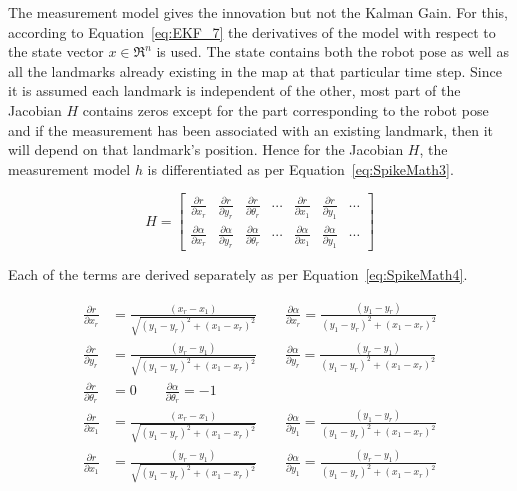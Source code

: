 The measurement model gives the innovation but not the Kalman Gain. For this, according to Equation~\ref{eq:EKF_7} the derivatives of the model with respect to the state vector $ x \in \Re^n $ is used. The state contains both the robot pose as well as all the landmarks already existing in the map at that particular time step. Since it is assumed each landmark is independent of the other, most part of the Jacobian $ H $ contains zeros except for the part corresponding to the robot pose and if the measurement has been associated with an existing landmark, then it will depend on that landmark's position. Hence for the Jacobian $ H $, the measurement model $ h $ is differentiated as per Equation~\ref{eq:SpikeMath3}. 

\begin{equation}
\label{eq:SpikeMath3}
	H = 
	\begin{bmatrix}
	\frac{\partial r}{\partial x_r} & \frac{\partial r}{\partial y_r} & \frac{\partial r}{\partial \theta_r} & \cdots & \frac{\partial r}{\partial x_1} & \frac{\partial r}{\partial y_1} & \cdots \\
	\frac{\partial \alpha}{\partial x_r} & \frac{\partial \alpha}{\partial y_r} & \frac{\partial \alpha}{\partial \theta_r} & \cdots & \frac{\partial \alpha}{\partial x_1} & \frac{\partial \alpha}{\partial y_1} & \cdots 
	\end{bmatrix}
\end{equation}

Each of the terms are derived separately as per Equation~\ref{eq:SpikeMath4}. 

\begin{subequations}
\label{eq:SpikeMath4}
	\begin{align}
	\frac{\partial r}{\partial x_r} &= \frac{(x_r-x_1)}{\sqrt{(y_1-y_r)^2+(x_1-x_r)^2}} \qquad
	\frac{\partial \alpha}{\partial x_r} =  
	\frac{(y_1-y_r)}{(y_1-y_r)^2+(x_1-x_r)^2} \\
	\frac{\partial r}{\partial y_r} &= \frac{(y_r-y_1)}{\sqrt{(y_1-y_r)^2+(x_1-x_r)^2}} \qquad
	\frac{\partial \alpha}{\partial y_r} =  
	\frac{(y_r-y_1)}{(y_1-y_r)^2+(x_1-x_r)^2} \\
	\frac{\partial r}{\partial \theta_r} &= 0 \qquad  
	\frac{\partial \alpha}{\partial \theta_r} = -1\\
	\frac{\partial r}{\partial x_1} &= \frac{(x_r-x_1)}{\sqrt{(y_1-y_r)^2+(x_1-x_r)^2}} \qquad
	\frac{\partial \alpha}{\partial y_1} =  
	\frac{(y_1-y_r)}{(y_1-y_r)^2+(x_1-x_r)^2} \\
	\frac{\partial r}{\partial x_1} &= \frac{(y_r-y_1)}{\sqrt{(y_1-y_r)^2+(x_1-x_r)^2}} \qquad
	\frac{\partial \alpha}{\partial y_1} =  
	\frac{(y_r-y_1)}{(y_1-y_r)^2+(x_1-x_r)^2}	
	\end{align}
\end{subequations}

